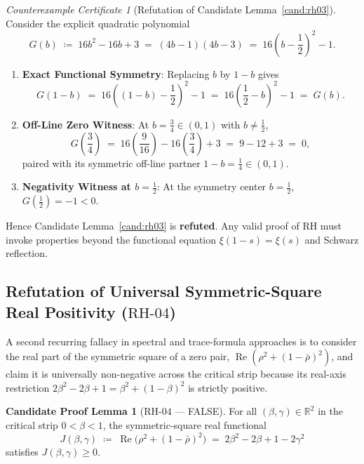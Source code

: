 \documentclass[11pt,a4paper]{article}
\theoremstyle{plain}
\theoremstyle{definition}
\newtheorem{candidate}[theorem]{Candidate Proof Lemma}
\theoremstyle{remark}
\newtheorem{counterexample}[theorem]{Counterexample Certificate}
\newcommand{\R}{\mathbb{R}}
\DeclareMathOperator{\RePart}{Re}
\begin{document}
\begin{counterexample}[Refutation of Candidate Lemma~\ref{cand:rh03}]
Consider the explicit quadratic polynomial
\begin{equation}
  G(b) \;\coloneqq\; 16b^2 - 16b + 3 \;=\; (4b - 1)(4b - 3) \;=\; 16\left(b - \frac{1}{2}\right)^2 - 1.
\end{equation}
\begin{enumerate}
  \item \textbf{Exact Functional Symmetry}: Replacing $b$ by $1 - b$ gives
  \[
    G(1 - b) \;=\; 16\left((1 - b) - \frac{1}{2}\right)^2 - 1 \;=\; 16\left(\frac{1}{2} - b\right)^2 - 1 \;=\; G(b).
  \]
  \item \textbf{Off-Line Zero Witness}: At $b = \frac{3}{4} \in (0, 1)$ with $b \ne \frac{1}{2}$,
  \[
    G\!\left(\frac{3}{4}\right) \;=\; 16\left(\frac{9}{16}\right) - 16\left(\frac{3}{4}\right) + 3 \;=\; 9 - 12 + 3 \;=\; 0,
  \]
  paired with its symmetric off-line partner $1 - b = \frac{1}{4} \in (0, 1)$.
  \item \textbf{Negativity Witness at $b = \frac{1}{2}$}: At the symmetry center $b = \frac{1}{2}$, $G(\frac{1}{2}) = -1 < 0$.
\end{enumerate}
Hence Candidate Lemma~\ref{cand:rh03} is \textbf{refuted}. Any valid proof of RH must invoke properties beyond the functional equation $\xi(1-s)=\xi(s)$ and Schwarz reflection.
\end{counterexample}

\subsection{Refutation of Universal Symmetric-Square Real Positivity (\texorpdfstring{$\mathrm{RH\text{-}04}$}{RH-04})}

A second recurring fallacy in spectral and trace-formula approaches is to consider the real part of the symmetric square of a zero pair, $\RePart(\rho^2 + (1-\bar{\rho})^2)$, and claim it is universally non-negative across the critical strip because its real-axis restriction $2\beta^2 - 2\beta + 1 = \beta^2 + (1-\beta)^2$ is strictly positive.

\begin{candidate}[$\mathrm{RH\text{-}04}$ --- FALSE]\label{cand:rh04}
For all $(\beta, \gamma) \in \R^2$ in the critical strip $0 < \beta < 1$, the symmetric-square real functional
\begin{equation}
  J(\beta, \gamma) \;\coloneqq\; \RePart\!\bigl(\rho^2 + (1 - \bar{\rho})^2\bigr) \;=\; 2\beta^2 - 2\beta + 1 - 2\gamma^2
\end{equation}
satisfies $J(\beta, \gamma) \ge 0$.
\end{candidate}
\end{document}
